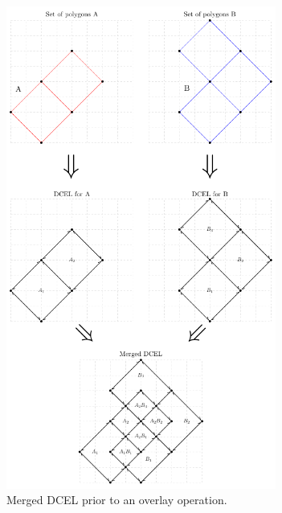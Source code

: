 \documentclass[11pt]{report}
\begin{document}
\begin{figure}
    \centering
    \includegraphics[width=0.79\textwidth]{Overlay}
    \caption{Merged DCEL prior to an overlay operation.}\label{fig:overlay}
\end{figure}



\end{document}
